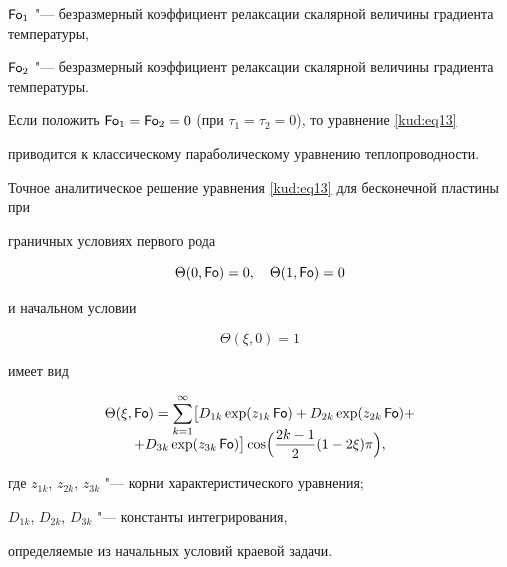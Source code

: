 $\operatorname{\sf Fo}_1 $ "--- безразмерный коэффициент релаксации скалярной величины градиента температуры, 

$\operatorname{\sf Fo}_2 $ "--- безразмерный коэффициент релаксации скалярной величины градиента температуры.








Если положить $\operatorname{\sf Fo}_1 =\operatorname{\sf Fo}_2 =0$ (при $\tau_1=\tau_2=0$), то уравнение \eqref{kud:eq13}

приводится к классическому параболическому уравнению теплопроводности.



Точное аналитическое решение уравнения \eqref{kud:eq13} для бесконечной пластины при

граничных условиях первого рода

$$

 \Theta( 0,\operatorname{\sf Fo})=0, \quad  \Theta( 1,\operatorname{\sf Fo})=0

$$

и начальном условии

$$

 \Theta( \xi,0)=1

$$

имеет вид

\begin{multline}

\label{kud:eq14}

 \Theta( \xi,\operatorname{\sf Fo})=

 \sum\limits_{k=1}^\infty 

\bigl[ D_{1k} \exp (z_{1k} \operatorname{\sf Fo})+D_{2k} \exp (z_{2k} \operatorname{\sf Fo})+\\[-3mm]

+D_{3k} \exp (z_{3k} \operatorname{\sf Fo}) \bigr]

\cos \Bigl(

\frac{2k-1}{2}(1-2 \xi)\pi \Bigr) ,

\end{multline}

где $z_{1k} $, $z_{2k} $, $z_{3k} $ "--- корни характеристического уравнения;

$D_{1k} $, $D_{2k} $, $D_{3k} $ "--- константы интегрирования, 

определяемые из начальных условий краевой задачи.



